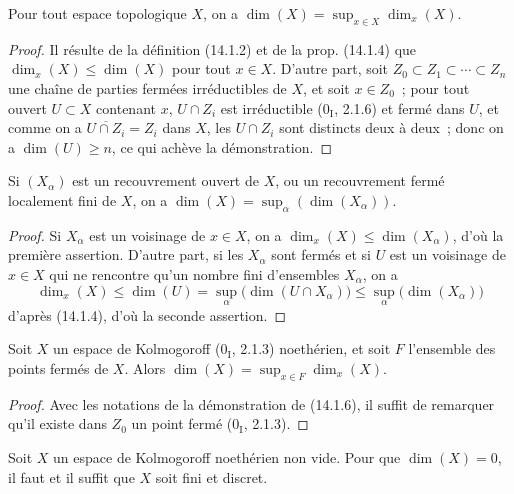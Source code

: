 \begin{proposition}[14.1.6]
\label{0.14.1.6-fr}
Pour tout espace topologique $X$, on a
$\dim(X)=\sup_{x\in X}\dim_x(X)$.
\end{proposition}

\begin{proof}
Il résulte de la définition (14.1.2) et de la prop. (14.1.4) que
$\dim_x(X)\leq\dim(X)$ pour tout $x\in X$. D'autre part, soit
$Z_0\subset Z_1\subset\cdots\subset Z_n$ une chaîne de parties fermées
irréductibles de $X$, et soit $x\in Z_0$~; pour tout ouvert $U\subset X$
contenant $x$, $U\cap Z_i$ est irréductible ($0_{\mathrm I}$, 2.1.6) et
fermé dans $U$, et comme on a $\overline{U\cap Z_i}=Z_i$ dans $X$, les
$U\cap Z_i$ sont distincts deux à deux~; donc on a $\dim(U)\geq n$, ce qui
achève la démonstration.
\end{proof}

\begin{corollary}[14.1.7]
\label{0.14.1.7-fr}
Si $(X_\alpha)$ est un recouvrement ouvert de $X$, ou un recouvrement fermé
localement fini de $X$, on a
$\dim(X)=\sup_\alpha(\dim(X_\alpha))$.
\end{corollary}

\begin{proof}
Si $X_\alpha$ est un voisinage de $x\in X$, on a
$\dim_x(X)\leq\dim(X_\alpha)$, d'où la première assertion. D'autre part, si
les $X_\alpha$ sont fermés et si $U$ est un voisinage de $x\in X$ qui ne
rencontre qu'un nombre fini d'ensembles $X_\alpha$, on a
\[
  \dim_x(X)\leq\dim(U)=\sup_\alpha\bigl(\dim(U\cap X_\alpha)\bigr)
  \leq\sup_\alpha\bigl(\dim(X_\alpha)\bigr)
\]
d'après (14.1.4), d'où la seconde assertion.
\end{proof}

\begin{corollary}[14.1.8]
\label{0.14.1.8-fr}
Soit $X$ un espace de Kolmogoroff ($0_{\mathrm I}$, 2.1.3) noethérien, et
soit $F$ l'ensemble des points fermés de $X$. Alors
$\dim(X)=\sup_{x\in F}\dim_x(X)$.
\end{corollary}

\begin{proof}
Avec les notations de la démonstration de (14.1.6), il suffit de remarquer
qu'il existe dans $Z_0$ un point fermé ($0_{\mathrm I}$, 2.1.3).
\end{proof}

\begin{proposition}[14.1.9]
\label{0.14.1.9-fr}
Soit $X$ un espace de Kolmogoroff noethérien non vide. Pour que
$\dim(X)=0$, il faut et il suffit que $X$ soit fini et discret.
\end{proposition}

